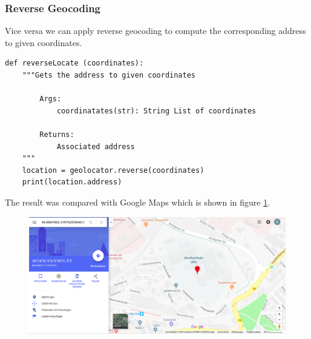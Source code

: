\documentclass[12pt]{article}
\begin{document}
\subsubsection{Reverse Geocoding}
Vice versa we can apply reverse geocoding to compute the corresponding address to given coordinates.
\begin{lstlisting}[breaklines=true]
def reverseLocate (coordinates):
    """Gets the address to given coordinates
        
        Args: 
            coordinatates(str): String List of coordinates
	        
        Returns: 
            Associated address  
    """
    location = geolocator.reverse(coordinates)
    print(location.address)
\end{lstlisting}
The result was compared with Google Maps which is shown in figure \ref{fig:geocode}.
\begin{figure}[H]
\hspace{-1.2cm}
\includegraphics[width=1.2\textwidth]{img/geocode}
\label{fig:geocode}
\end{figure}
\end{document}
